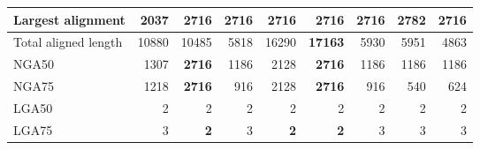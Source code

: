 \documentclass[12pt,a4paper]{article}
\begin{document}
\begin{table}[ht]
\begin{center}
\begin{tabular}{|l*{8}{|r}|}
Largest alignment & 2037 & 2716 & 2716 & 2716 & 2716 & 2716 & {\bf 2782} & 2716 \\ \hline
Total aligned length & 10880 & 10485 & 5818 & 16290 & {\bf 17163} & 5930 & 5951 & 4863 \\ \hline
NGA50 & 1307 & {\bf 2716} & 1186 & 2128 & {\bf 2716} & 1186 & 1186 & 1186 \\ \hline
NGA75 & 1218 & {\bf 2716} & 916 & 2128 & {\bf 2716} & 916 & 540 & 624 \\ \hline
LGA50 & 2 & 2 & 2 & 2 & 2 & 2 & 2 & 2 \\ \hline
LGA75 & 3 & {\bf 2} & 3 & {\bf 2} & {\bf 2} & 3 & 3 & 3 \\ \hline
\end{tabular}
\end{center}
\end{table}
\end{document}
